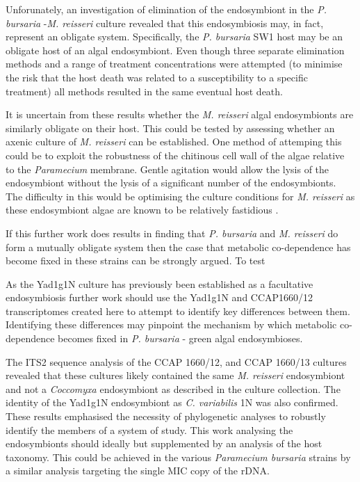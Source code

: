 
Unforunately, an 
investigation of elimination of the endosymbiont in the \textit{P. bursaria}
-\textit{M. reisseri} culture revealed that this endosymbiosis
may, in fact, represent an obligate system. Specifically, the
\textit{P. bursaria} SW1 host may be an obligate host of 
an algal endosymbiont.  Even though three separate elimination methods and
a range of treatment concentrations were attempted (to minimise the 
risk that the host death was related to a susceptibility to a 
specific treatment) all methods resulted in the same eventual host death.

It is uncertain from these results whether 
the \textit{M. reisseri}
algal endosymbionts are similarly obligate on their host.
This could be tested by assessing whether an axenic culture of 
\textit{M. reisseri} can be established. One method
of attemping this could be to 
exploit the robustness of the chitinous cell wall
of the algae relative to the \textit{Paramecium} membrane. Gentle agitation
would allow the lysis of the endosymbiont without the lysis of a significant
number of the endosymbionts.  The difficulty in this would be optimising
the culture conditions for \textit{M. reisseri} 
as these endosymbiont algae are known to be relatively fastidious \citep{Hoshina2009}.

If this further work does results in finding that 
\textit{P. bursaria} and \textit{M. reisseri} do form
a mutually obligate system then 
the case that metabolic co-dependence has become
fixed in these strains can be strongly argued.
To test


As the Yad1g1N culture has previously been established as
a facultative endosymbiosis 
further work should use the Yad1g1N and CCAP1660/12 
transcriptomes created here to attempt to identify key differences 
between them.  Identifying these differences may pinpoint
the mechanism by which metabolic co-dependence becomes fixed in \textit{P. bursaria}
- green algal endosymbioses.


The ITS2 sequence analysis of the CCAP 1660/12,
and CCAP 1660/13 cultures revealed that these cultures likely contained 
the same \textit{M. reisseri} endosymbiont and not a \textit{Coccomyxa}
endosymbiont as described in the culture collection. 
The identity of the Yad1g1N endosymbiont
as \textit{C. variabilis} 1N was also confirmed.
These results emphasised the necessity of phylogenetic
analyses to robustly identify the members of a system of study.
This work analysing the endosymbionts should ideally but supplemented
by an analysis of the host taxonomy. 
This could be achieved in the 
various \textit{Paramecium bursaria} strains by
a similar analysis targeting the single MIC copy of the rDNA.


